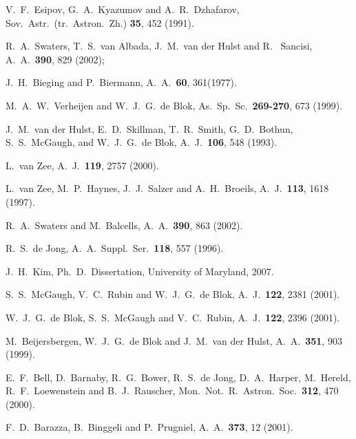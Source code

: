 \documentclass[preprint,aps]{revtex4}
\begin{document}
\begin{thebibliography}{}
  V.~F.~Esipov, G.~A.~Kyazumov and A.~R.~Dzhafarov,  Sov.~Astr.~(tr.~Astron.~Zh.) {\bf 35}, 452 (1991).

 R.~A.~Swaters, T.~S.~van Albada, J.~M.~van der Hulst and R.~ Sancisi,
A.~A.~{\bf 390}, 829 (2002); 



 J.~H.~Bieging and P.~Biermann, A.~A.~{\bf 60}, 361(1977).





 M.~A.~W.~Verheijen and  W.~J.~G.~de Blok, As.~Sp.~Sc.~{\bf 269-270}, 673 (1999).

 J.~M.~van der Hulst, E.~D.~Skillman, T.~R.~Smith, G.~D.~Bothun, S.~S.~McGaugh, and W.~J.~G.~de Blok, A.~J.~{\bf 106}, 548 (1993).

  L.~van Zee, A.~J.~{\bf 119}, 2757 (2000).



  L.~van Zee, M.~P.~Haynes, J.~J.~Salzer and A.~H.~Broeils, A.~J.~{\bf 113}, 1618 (1997).

 R.~A.~Swaters and M.~Balcells, A.~A.~{\bf 390}, 863 (2002). 


 R.~S.~de Jong, A.~A.~Suppl.~Ser.~{\bf 118}, 557 (1996).

 J.~H.~Kim, Ph.~D.~Dissertation, University of Maryland, 2007. 


 S.~S.~McGaugh, V.~C.~Rubin and W.~J.~G.~de Blok, A.~J.~{\bf 122}, 2381 (2001).

  W.~J.~G.~de Blok, S.~S.~McGaugh and V.~C.~Rubin, A.~J.~{\bf 122}, 2396 (2001).

 M.~Beijersbergen, W.~J.~G.~de Blok and J.~M.~van der Hulst, A.~A.~{\bf 351}, 903 (1999).

 E.~F.~Bell, D.~Barnaby, R.~G.~Bower, R.~S.~de Jong,
D.~A.~Harper,  M.~Hereld, R.~F.~Loewenstein and B.~J.~Rauscher, Mon.~Not.~R.~Astron.~Soc.~{\bf 312}, 470 (2000).


 F.~D.~Barazza, B.~Binggeli and P.~Prugniel, A.~A.~{\bf 373},
12 (2001).


























\end{thebibliography}
\end{document}
